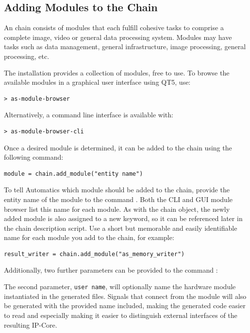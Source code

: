 \subsection{Adding Modules to the \asterics Chain}
\label{ssec:02-adding}

An \asterics chain consists of \asterics modules that each fulfill cohesive tasks to comprise a complete image, video or general data processing system.
Modules may have tasks such as data management, general infrastructure, image processing, general processing, etc.

The \asterics installation provides a collection of modules, free to use.
To browse the available modules in a graphical user interface using QT5, use:
\begin{lstlisting}[style=Shell]
 > as-module-browser
\end{lstlisting} 

Alternatively, a command line interface is available with:
\begin{lstlisting}[style=Shell]
 > as-module-browser-cli
\end{lstlisting}

Once a desired module is determined, it can be added to the \asterics chain using the following command:
\begin{lstlisting}[style=AutomaticsPython]
module = chain.add_module("entity name")
\end{lstlisting} 

To tell Automatics which module should be added to the chain, provide the entity name of the module to the command .
Both the CLI and GUI module browser list this name for each module.
As with the chain object, the newly added module is also assigned to a new keyword, so it can be referenced later in the chain description script.
Use a short but memorable and easily identifiable name for each module you add to the chain, for example:
\begin{lstlisting}[style=AutomaticsPython]
result_writer = chain.add_module("as_memory_writer")
\end{lstlisting}

Additionally, two further parameters can be provided to the command :

The second parameter, \texttt{user name}, will optionally name the hardware module instantiated in the generated files.
Signals that connect from the module will also be generated with the provided name included, making the generated code easier to read and especially making it easier to distinguish external interfaces of the resulting IP-Core.

